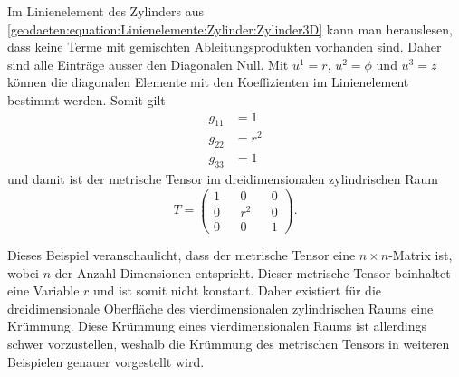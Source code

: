 Im Linienelement des Zylinders aus \eqref{geodaeten:equation:Linienelemente:Zylinder:Zylinder3D} kann man herauslesen, dass keine Terme mit gemischten Ableitungsprodukten vorhanden sind.
Daher sind alle Einträge ausser den Diagonalen Null.
Mit $u^1 = r$, $u^2 = \phi$ und $u^3 = z$  können die diagonalen Elemente mit den Koeffizienten im Linienelement bestimmt werden. 
Somit gilt
\begin{equation}
	\begin{aligned}
		g_{11}  &= 1  \\
		g_{22}  &= r^2 \\
		g_{33}  &= 1  
	\end{aligned}
\end{equation}
und damit ist der metrische Tensor im dreidimensionalen zylindrischen Raum
\begin{equation}
	T = \begin{pmatrix} 1 && 0 && 0 \\ 0 && r^2 && 0 \\ 0 && 0 && 1 \end{pmatrix} .
\end{equation}

Dieses Beispiel veranschaulicht, dass der metrische Tensor eine $n \times n$-Matrix ist, wobei $n$ der Anzahl Dimensionen entspricht.
Dieser metrische Tensor beinhaltet eine Variable $r$ und ist somit nicht konstant. 
Daher existiert für die dreidimensionale Oberfläche des vierdimensionalen zylindrischen Raums eine Krümmung.
Diese Krümmung eines vierdimensionalen Raums ist allerdings schwer vorzustellen, weshalb die Krümmung des metrischen Tensors in weiteren Beispielen genauer vorgestellt wird.
